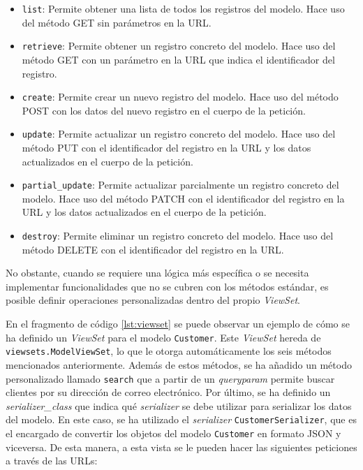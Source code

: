 \begin{itemize}
    \item \texttt{list}: Permite obtener una lista de todos los registros del modelo. Hace uso del método GET sin parámetros en la URL.
    \item \texttt{retrieve}: Permite obtener un registro concreto del modelo. Hace uso del método GET con un parámetro en la URL que indica el identificador del registro.
    \item \texttt{create}: Permite crear un nuevo registro del modelo. Hace uso del método POST con los datos del nuevo registro en el cuerpo de la petición.
    \item \texttt{update}: Permite actualizar un registro concreto del modelo. Hace uso del método PUT con el identificador del registro en la URL y los datos actualizados en el cuerpo de la petición.
    \item \texttt{partial\_update}: Permite actualizar parcialmente un registro concreto del modelo. Hace uso del método PATCH con el identificador del registro en la URL y los datos actualizados en el cuerpo de la petición.
    \item \texttt{destroy}: Permite eliminar un registro concreto del modelo. Hace uso del método DELETE con el identificador del registro en la URL.
\end{itemize}

No obstante, cuando se requiere una lógica más específica o se necesita implementar funcionalidades que no se cubren con los métodos estándar, es posible definir operaciones personalizadas dentro del propio \textit{ViewSet}.

\begin{center}
    \begin{minipage}{0.8\textwidth}
        
    \end{minipage}
\end{center}

En el fragmento de código \ref{lst:viewset} se puede observar un ejemplo de cómo se ha definido un \textit{ViewSet} para el modelo \texttt{Customer}. Este \textit{ViewSet} hereda de \texttt{viewsets.ModelViewSet}, lo que le otorga automáticamente los seis métodos mencionados anteriormente. Además de estos métodos, se ha añadido un método personalizado llamado \texttt{search} que a partir de un \textit{queryparam} permite buscar clientes por su dirección de correo electrónico. Por último, se ha definido un \textit{serializer\_class} que indica qué \textit{serializer} se debe utilizar para serializar los datos del modelo. En este caso, se ha utilizado el \textit{serializer} \texttt{CustomerSerializer}, que es el encargado de convertir los objetos del modelo \texttt{Customer} en formato JSON y viceversa. De esta manera, a esta vista se le pueden hacer las siguientes peticiones a través de las URLs:

